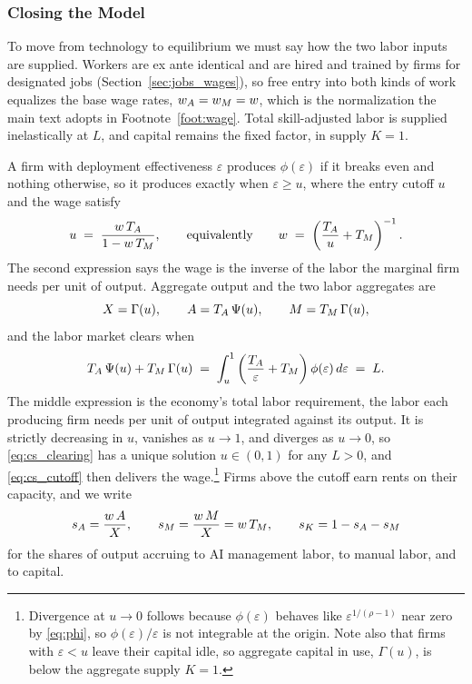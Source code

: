 \subsubsection*{Closing the Model}

To move from technology to equilibrium we must say how the two labor inputs are supplied.
Workers are ex ante identical and are hired and trained by firms for designated jobs (Section~\ref{sec:jobs_wages}), so free entry into both kinds of work equalizes the base wage rates, $w_{A} = w_{M} = w$, which is the normalization the main text adopts in Footnote~\ref{foot:wage}.
Total skill-adjusted labor is supplied inelastically at $L$, and capital remains the fixed factor, in supply $K = 1$.

A firm with deployment effectiveness $\varepsilon$ produces $\phi(\varepsilon)$ if it breaks even and nothing otherwise, so it produces exactly when $\varepsilon \geq u$, where the entry cutoff $u$ and the wage satisfy
\begin{equation}
u \;=\; \frac{w\,T_{A}}{1 - w\,T_{M}},
\qquad\text{equivalently}\qquad
w \;=\; \left(\frac{T_{A}}{u} + T_{M}\right)^{-1}.
\label{eq:cs_cutoff}
\end{equation}
The second expression says the wage is the inverse of the labor the marginal firm needs per unit of output.
Aggregate output and the two labor aggregates are
\begin{equation}
X = \Gamma(u), \qquad A = T_{A}\,\Psi(u), \qquad M = T_{M}\,\Gamma(u),
\label{eq:cs_aggregates}
\end{equation}
and the labor market clears when
\begin{equation}
T_{A}\,\Psi(u) + T_{M}\,\Gamma(u)
\;=\;
\int_u^1 \left(\frac{T_{A}}{\varepsilon} + T_{M}\right)\phi(\varepsilon)\,d\varepsilon
\;=\; L.
\label{eq:cs_clearing}
\end{equation}
The middle expression is the economy's total labor requirement, the labor each producing firm needs per unit of output integrated against its output.
It is strictly decreasing in $u$, vanishes as $u \to 1$, and diverges as $u \to 0$, so \eqref{eq:cs_clearing} has a unique solution $u \in (0,1)$ for any $L > 0$, and \eqref{eq:cs_cutoff} then delivers the wage.\footnote{
Divergence at $u \to 0$ follows because $\phi(\varepsilon)$ behaves like $\varepsilon^{1/(\rho-1)}$ near zero by \eqref{eq:phi}, so $\phi(\varepsilon)/\varepsilon$ is not integrable at the origin.
Note also that firms with $\varepsilon < u$ leave their capital idle, so aggregate capital in use, $\Gamma(u)$, is below the aggregate supply $K = 1$.
}
Firms above the cutoff earn rents on their capacity, and we write
\[
s_{A} = \frac{w\,A}{X},
\qquad
s_{M} = \frac{w\,M}{X} = w\,T_{M},
\qquad
s_{K} = 1 - s_{A} - s_{M}
\]
for the shares of output accruing to AI management labor, to manual labor, and to capital.

